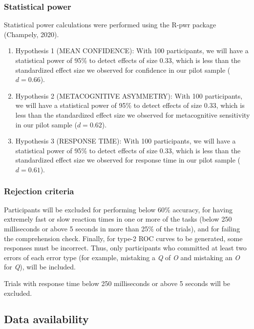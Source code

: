 \documentclass[
  english,
  man,floatsintext]{apa6}
\begin{document}
\hypertarget{statistical-power}{%
\subsubsection{Statistical power}\label{statistical-power}}

Statistical power calculations were performed using the R-pwr package (Champely, 2020).

\begin{enumerate}
\def\labelenumi{\arabic{enumi}.}
\item
  Hypothesis 1 (MEAN CONFIDENCE): With 100 participants, we will have a statistical power of 95\% to detect effects of size 0.33, which is less than the standardized effect size we observed for confidence in our pilot sample (\(d=0.66\)).
\item
  Hypothesis 2 (METACOGNITIVE ASYMMETRY): With 100 participants, we will have a statistical power of 95\% to detect effects of size 0.33, which is less than the standardized effect size we observed for metacognitive sensitivity in our pilot sample (\(d=0.62\)).
\item
  Hypothesis 3 (RESPONSE TIME): With 100 participants, we will have a statistical power of 95\% to detect effects of size 0.33, which is less than the standardized effect size we observed for response time in our pilot sample (\(d=0.61\)).
\end{enumerate}

\hypertarget{rejection-criteria}{%
\subsubsection{Rejection criteria}\label{rejection-criteria}}

Participants will be excluded for performing below 60\% accuracy, for having extremely fast or slow reaction times in one or more of the tasks (below 250 milliseconds or above 5 seconds in more than 25\% of the trials), and for failing the comprehension check. Finally, for type-2 ROC curves to be generated, some responses must be incorrect. Thus, only participants who committed at least two errors of each error type (for example, mistaking a \emph{Q} of \emph{O} and mistaking an \emph{O} for \emph{Q}), will be included.

Trials with response time below 250 milliseconds or above 5 seconds will be excluded.

\hypertarget{data-availability}{%
\subsection{Data availability}\label{data-availability}}
\end{document}
